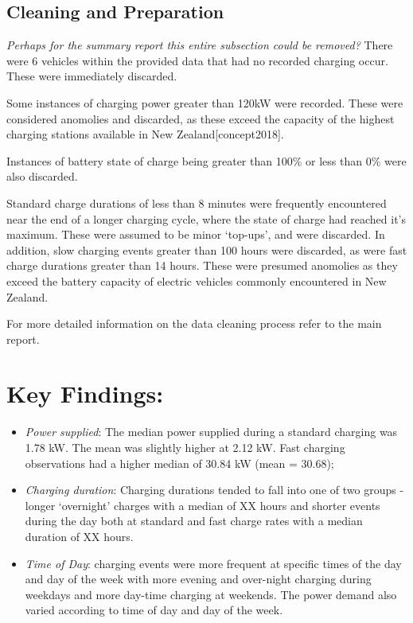\documentclass[]{article}
\providecommand{\tightlist}{%
  \setlength{\itemsep}{0pt}\setlength{\parskip}{0pt}}
\begin{document}
\subsection{Cleaning and Preparation}\label{cleaning-and-preparation}

\emph{Perhaps for the summary report this entire subsection could be
removed?} There were 6 vehicles within the provided data that had no
recorded charging occur. These were immediately discarded.

Some instances of charging power greater than 120kW were recorded. These
were considered anomolies and discarded, as these exceed the capacity of
the highest charging stations available in New Zealand{[}concept2018{]}.

Instances of battery state of charge being greater than 100\% or less
than 0\% were also discarded.

Standard charge durations of less than 8 minutes were frequently
encountered near the end of a longer charging cycle, where the state of
charge had reached it's maximum. These were assumed to be minor
`top-ups', and were discarded. In addition, slow charging events greater
than 100 hours were discarded, as were fast charge durations greater
than 14 hours. These were presumed anomolies as they exceed the battery
capacity of electric vehicles commonly encountered in New Zealand.

For more detailed information on the data cleaning process refer to the
main report.

\section{Key Findings:}\label{key-findings}

\begin{itemize}
\tightlist
\item
  \emph{Power supplied}: The median power supplied during a standard
  charging was 1.78 kW. The mean was slightly higher at 2.12 kW. Fast
  charging observations had a higher median of 30.84 kW (mean = 30.68);
\item
  \emph{Charging duration}: Charging durations tended to fall into one
  of two groups - longer `overnight' charges with a median of XX hours
  and shorter events during the day both at standard and fast charge
  rates with a median duration of XX hours.
\item
  \emph{Time of Day}: charging events were more frequent at specific
  times of the day and day of the week with more evening and over-night
  charging during weekdays and more day-time charging at weekends. The
  power demand also varied according to time of day and day of the week.
\end{itemize}
\end{document}
